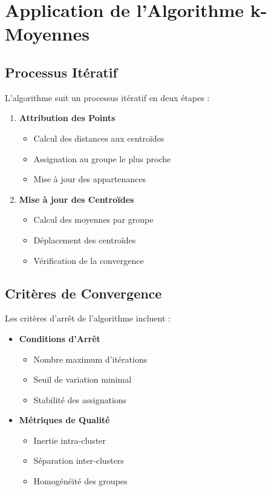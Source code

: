 \section{Application de l'Algorithme k-Moyennes}

\subsection{Processus Itératif}
L'algorithme suit un processus itératif en deux étapes :

\begin{enumerate}
    \item \textbf{Attribution des Points}
    \begin{itemize}
        \item Calcul des distances aux centroïdes
        \item Assignation au groupe le plus proche
        \item Mise à jour des appartenances
    \end{itemize}

    \item \textbf{Mise à jour des Centroïdes}
    \begin{itemize}
        \item Calcul des moyennes par groupe
        \item Déplacement des centroïdes
        \item Vérification de la convergence
    \end{itemize}
\end{enumerate}

\subsection{Critères de Convergence}
Les critères d'arrêt de l'algorithme incluent :

\begin{itemize}
    \item \textbf{Conditions d'Arrêt}
    \begin{itemize}
        \item Nombre maximum d'itérations
        \item Seuil de variation minimal
        \item Stabilité des assignations
    \end{itemize}

    \item \textbf{Métriques de Qualité}
    \begin{itemize}
        \item Inertie intra-cluster
        \item Séparation inter-clusters
        \item Homogénéité des groupes
    \end{itemize}
\end{itemize}

